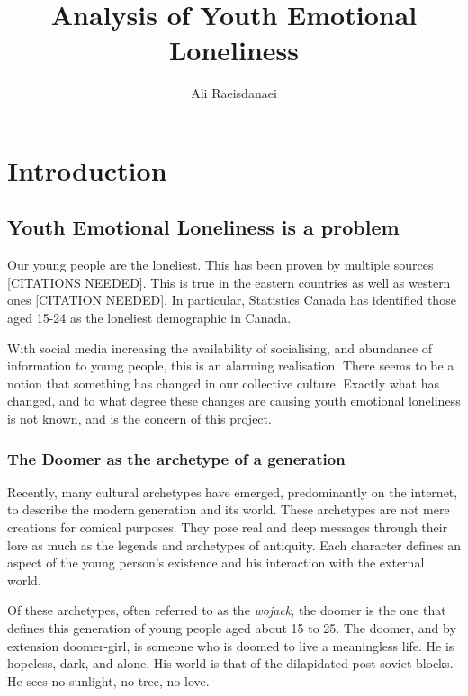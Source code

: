 \documentclass{article}
\begin{document}

\title{Analysis of Youth Emotional Loneliness}
\author{Ali Raeisdanaei}
\maketitle

\section{Introduction}
\subsection{Youth Emotional Loneliness is a problem}
Our young people are the loneliest. This has been proven by multiple sources [CITATIONS NEEDED]. 
This is true in the eastern countries as well as western ones [CITATION NEEDED].
In particular, Statistics Canada has identified those aged 15-24 as the loneliest demographic in Canada. 

With social media increasing the availability of socialising, and abundance of information to young people, this is an alarming realisation. 
There seems to be a notion that something has changed in our collective culture. 
Exactly what has changed, and to what degree these changes are causing youth emotional loneliness is not known, and is the concern of this project.

\subsubsection{The Doomer as the archetype of a generation}

Recently, many cultural archetypes have emerged, predominantly on the internet, to describe the modern generation and its world. 
These archetypes are not mere creations for comical purposes. They pose real and deep messages through their lore as much as the legends and archetypes of antiquity.
Each character defines an aspect of the young person's existence and his interaction with the external world. 

Of these archetypes, often referred to as the \textit{wojack}, the doomer is the one that defines this generation of young people aged about 15 to 25.
The doomer, and by extension doomer-girl, is someone who is doomed to live a meaningless life. 
He is hopeless, dark, and alone. His world is that of the dilapidated post-soviet blocks. He sees no sunlight, no tree, no love. 
\end{document}
